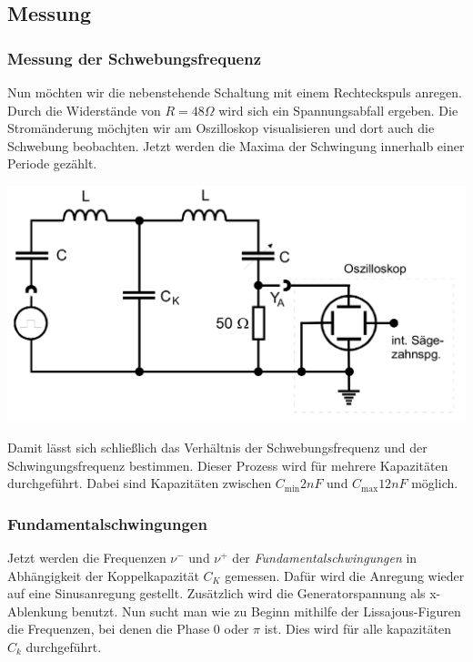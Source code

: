 \subsection{Messung}
\subsubsection*{Messung der Schwebungsfrequenz}
\begin{minipage}{0.3\textwidth}
    Nun möchten wir die nebenstehende Schaltung mit einem Rechteckspuls anregen.
    Durch die Widerstände von $R = 48 \Omega$ wird sich ein Spannungsabfall ergeben.
    Die Stromänderung möchjten wir am Oszilloskop visualisieren und dort auch die Schwebung beobachten.
    Jetzt werden die Maxima der Schwingung innerhalb einer Periode gezählt.
\end{minipage}
\begin{minipage}{0.7\textwidth}
    \includegraphics[width=\textwidth]{pictures/schwebeschaltung.png}
\end{minipage}

Damit lässt sich schließlich das Verhältnis der Schwebungsfrequenz und der Schwingungsfrequenz bestimmen.
Dieser Prozess wird für mehrere Kapazitäten durchgeführt.
Dabei sind Kapazitäten zwischen $C_{\text{min}} 2 nF$ und $C_{\text{max}} 12 nF$ möglich.

\subsubsection*{Fundamentalschwingungen}
Jetzt werden die Frequenzen $\nu^{-}$ und $\nu^{+}$ der \textit{Fundamentalschwingungen} in 
Abhängigkeit der Koppelkapazität $C_{K}$ gemessen.
Dafür wird die Anregung wieder auf eine Sinusanregung gestellt.
Zusätzlich wird die Generatorspannung als x-Ablenkung benutzt.
Nun sucht man wie zu Beginn mithilfe der Lissajous-Figuren die Frequenzen, bei denen die Phase 0 oder $\pi$ ist.
Dies wird für alle kapazitäten $C_{k}$ durchgeführt.

